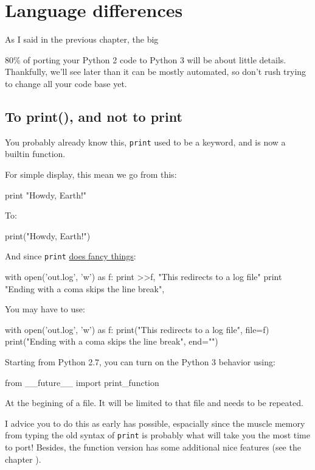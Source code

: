 
\chapter{Language differences}

As I said in the previous chapter, the big

80\% of porting your Python 2 code to Python 3 will be about little details. Thankfully, we'll see later than it can be mostly automated, so don't rush trying to change all your code base yet.

\section{To print(), and not to print}

You probably already know this, \lstinline{print} used to be a keyword, and is now a builtin function.

For simple display, this mean we go from this:

\begin{py2}
print "Howdy, Earth!"
\end{py2}


To:

\begin{py3}
print("Howdy, Earth!")
\end{py3}

And since \lstinline{print} \href{https://www.python.org/dev/peps/pep-0214/}{does fancy things}:

\begin{py2}
with open('out.log', 'w') as f:
    print >>f, "This redirects to a log file"
print "Ending with a coma skips the line break",
\end{py2}

You may have to use:

\begin{py3}
with open('out.log', 'w') as f:
    print("This redirects to a log file", file=f)
print("Ending with a coma skips the line break", end="")
\end{py3}

Starting from Python 2.7, you can turn on the Python 3 behavior using:

\begin{py2and3}
from __future__ import print_function
\end{py2and3}

At the begining of a file. It will be limited to that file and needs to be repeated.

I advice you to do this as early has possible, espacially since the muscle memory from typing the old syntax of \lstinline{print} is probably what will take you the most time to port! Besides, the function version has some additional nice features (see the chapter ).


